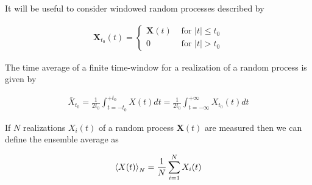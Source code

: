 \documentclass[12pt]{article}
\newcommand{\bv}[1]{\boldsymbol{#1}}
\begin{document}
It will be useful to consider windowed random processes described by

\begin{align}
\bv{X}_{t_0}(t) = 
\begin{cases}
\bv{X}(t) &\text{ for } |t|\le t_0\\
0 &\text { for } |t|> t_0
\end{cases}
\end{align}

The time average of a finite time-window for a realization of a random process is given by

\begin{align}
\bar{X}_{t_0} = \frac{1}{2t_0}\int_{t=-t_0}^{+t_0} X(t) dt = \frac{1}{2t_0}\int_{t=-\infty}^{+\infty}X_{t_0}(t)dt
\end{align}

If $N$ realizations $X_i(t)$ of a random process $\bv{X}(t)$ are measured then we can define the ensemble average as

\begin{align}
\Braket{X(t)}_N = \frac{1}{N} \sum_{i=1}^N X_i(t)
\end{align}
\end{document}

